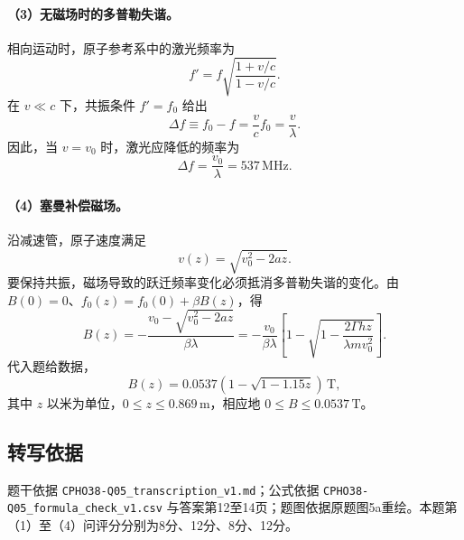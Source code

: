 \paragraph{（3）无磁场时的多普勒失谐。}
相向运动时，原子参考系中的激光频率为
\[
f'=f\sqrt{\frac{1+v/c}{1-v/c}}.
\]
在 $v\ll c$ 下，共振条件 $f'=f_0$ 给出
\[
\Delta f\equiv f_0-f=\frac{v}{c}f_0=\frac{v}{\lambda}.
\]
因此，当 $v=v_0$ 时，激光应降低的频率为
\[
\boxed{\Delta f=\frac{v_0}{\lambda}=537\,\mathrm{MHz}.}
\]

\paragraph{（4）塞曼补偿磁场。}
沿减速管，原子速度满足
\[
v(z)=\sqrt{v_0^2-2az}.
\]
要保持共振，磁场导致的跃迁频率变化必须抵消多普勒失谐的变化。由 $B(0)=0$、$f_0(z)=f_0(0)+\beta B(z)$，得
\[
\boxed{
B(z)=-\frac{v_0-\sqrt{v_0^2-2az}}{\beta\lambda}
=-\frac{v_0}{\beta\lambda}
\left[1-\sqrt{1-\frac{2\Gamma h z}{\lambda m v_0^2}}\right].}
\]
代入题给数据，
\[
\boxed{B(z)=0.0537\left(1-\sqrt{1-1.15z}\right)\,\mathrm T,}
\]
其中 $z$ 以米为单位，$0\le z\le0.869\,\mathrm m$，相应地 $0\le B\le0.0537\,\mathrm T$。

\subsection{转写依据}
题干依据 \texttt{CPHO38-Q05\_transcription\_v1.md}；公式依据 \texttt{CPHO38-Q05\_formula\_check\_v1.csv} 与答案第12至14页；题图依据原题图5a重绘。本题第（1）至（4）问评分分别为8分、12分、8分、12分。
